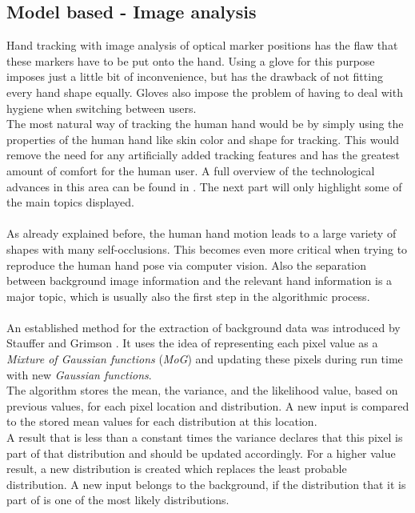 \subsection{Model based - Image analysis}
Hand tracking with image analysis of optical marker positions has the flaw that these markers have to be put onto the hand. Using a glove for this purpose imposes just a little bit of inconvenience, but has the drawback of not fitting every hand shape equally. Gloves also impose the problem of having to deal with hygiene when switching between users.\\The most natural way of tracking the human hand would be by simply using the properties of the human hand like skin color and shape for tracking. This would remove the need for any artificially added tracking features and has the greatest amount of comfort for the human user.
A full overview of the technological advances in this area can be found in \cite{Moeslund.2006,Moeslund.2001}. The next part will only highlight some of the main topics displayed.\\\\
As already explained before, the human hand motion leads to a large variety of shapes with many self-occlusions. This becomes even more critical when trying to reproduce the human hand pose via computer vision. Also the separation between background image information and the relevant hand information is a major topic, which is usually also the first step in the algorithmic process.\\\\
An established method for the extraction of background data was introduced by Stauffer and Grimson \cite{Stauffer.1999}. It uses the idea of representing each pixel value as a \textit{Mixture of Gaussian functions} (\textit{MoG}) and updating these pixels during run time with new \textit{Gaussian functions}.\\
The algorithm stores the mean, the variance, and the likelihood value, based on previous values, for each pixel location and distribution. 
A new input is compared to the stored mean values for each distribution at this location.\\
A result that is less than a constant times the variance declares that this pixel is part of that distribution and should be updated accordingly. For a higher value result, a new distribution is created which replaces the least probable distribution. A new input belongs to the background, if the distribution that it is part of is one of the most likely distributions.

